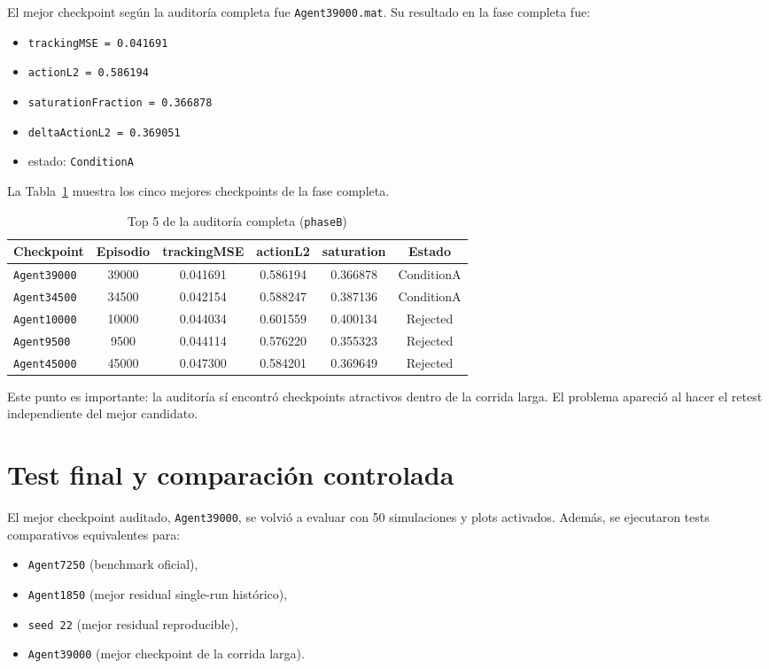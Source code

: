 \documentclass[11pt,a4paper]{article}
\begin{document}
El mejor checkpoint seg\'un la auditor\'ia completa fue \texttt{Agent39000.mat}. Su resultado en la fase completa fue:
\begin{itemize}
    \item \texttt{trackingMSE = 0.041691}
    \item \texttt{actionL2 = 0.586194}
    \item \texttt{saturationFraction = 0.366878}
    \item \texttt{deltaActionL2 = 0.369051}
    \item estado: \texttt{ConditionA}
\end{itemize}

La Tabla~\ref{tab:phaseb} muestra los cinco mejores checkpoints de la fase completa.

\begin{table}[H]
\centering
\caption{Top 5 de la auditor\'ia completa (\texttt{phaseB})}
\label{tab:phaseb}
\begin{tabularx}{\linewidth}{l c c c c c}
\toprule
Checkpoint & Episodio & trackingMSE & actionL2 & saturation & Estado \\
\midrule
\texttt{Agent39000} & 39000 & 0.041691 & 0.586194 & 0.366878 & ConditionA \\
\texttt{Agent34500} & 34500 & 0.042154 & 0.588247 & 0.387136 & ConditionA \\
\texttt{Agent10000} & 10000 & 0.044034 & 0.601559 & 0.400134 & Rejected \\
\texttt{Agent9500} & 9500 & 0.044114 & 0.576220 & 0.355323 & Rejected \\
\texttt{Agent45000} & 45000 & 0.047300 & 0.584201 & 0.369649 & Rejected \\
\bottomrule
\end{tabularx}
\end{table}

Este punto es importante: la auditor\'ia s\'i encontr\'o checkpoints atractivos dentro de la corrida larga. El problema apareci\'o al hacer el retest independiente del mejor candidato.

\section*{Test final y comparaci\'on controlada}
El mejor checkpoint auditado, \texttt{Agent39000}, se volvi\'o a evaluar con 50 simulaciones y plots activados. Adem\'as, se ejecutaron tests comparativos equivalentes para:
\begin{itemize}
    \item \texttt{Agent7250} (benchmark oficial),
    \item \texttt{Agent1850} (mejor residual single-run hist\'orico),
    \item \texttt{seed 22} (mejor residual reproducible),
    \item \texttt{Agent39000} (mejor checkpoint de la corrida larga).
\end{itemize}
\end{document}
